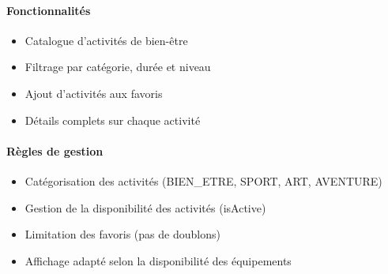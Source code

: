 \documentclass[
]{article}
\providecommand{\tightlist}{%
  \setlength{\itemsep}{0pt}\setlength{\parskip}{0pt}}
\begin{document}
\paragraph{Fonctionnalités}\label{fonctionnalituxe9s-4}

\begin{itemize}
\tightlist
\item
  Catalogue d’activités de bien-être
\item
  Filtrage par catégorie, durée et niveau
\item
  Ajout d’activités aux favoris
\item
  Détails complets sur chaque activité
\end{itemize}

\paragraph{Règles de gestion}\label{ruxe8gles-de-gestion-4}

\begin{itemize}
\tightlist
\item
  Catégorisation des activités (BIEN\_ETRE, SPORT, ART, AVENTURE)
\item
  Gestion de la disponibilité des activités (isActive)
\item
  Limitation des favoris (pas de doublons)
\item
  Affichage adapté selon la disponibilité des équipements
\end{itemize}
\end{document}
